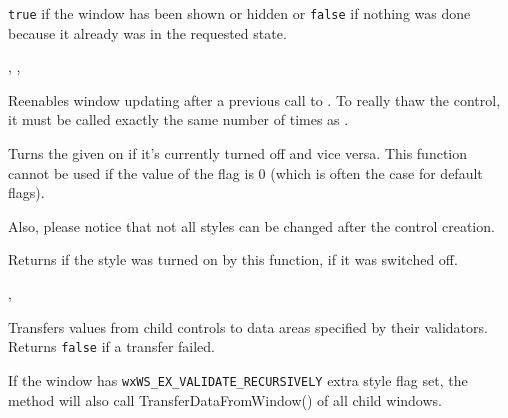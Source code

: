 


{\tt true} if the window has been shown or hidden or {\tt false} if nothing was
done because it already was in the requested state.


,\rtfsp
{},\rtfsp
{}


\label{wxwindowthaw}


Reenables window updating after a previous call to
. To really thaw the control, it must be called
exactly the same number of times as .




\label{wxwindowtogglewindowstyle}


Turns the given  on if it's currently turned off and vice versa.
This function cannot be used if the value of the flag is $0$ (which is often
the case for default flags).

Also, please notice that not all styles can be changed after the control
creation.


Returns \true if the style was turned on by this function, \false if it was
switched off.


,\rtfsp
{}


\label{wxwindowtransferdatafromwindow}


Transfers values from child controls to data areas specified by their validators. Returns
{\tt false} if a transfer failed.

If the window has {\tt wxWS\_EX\_VALIDATE\_RECURSIVELY} extra style flag set,
the method will also call TransferDataFromWindow() of all child windows.


